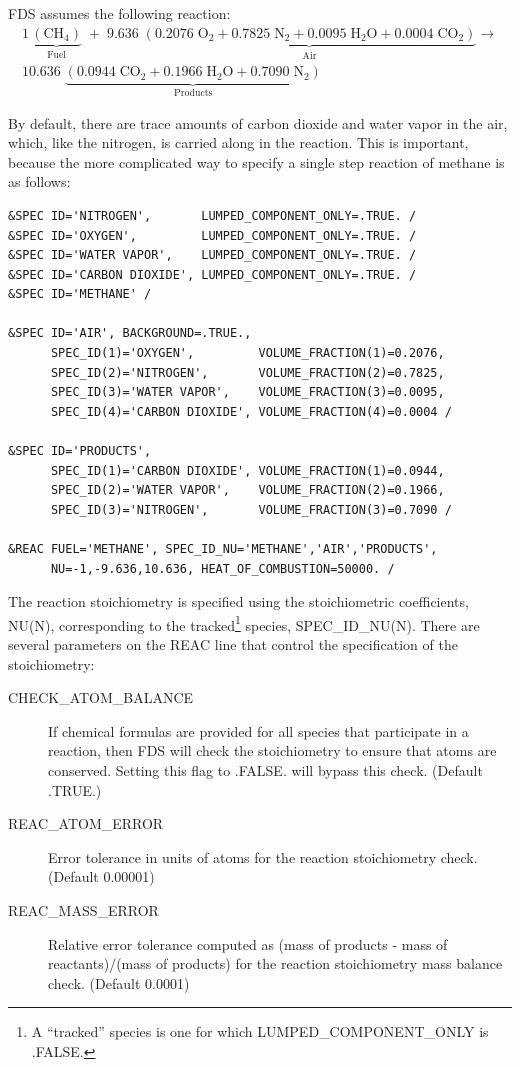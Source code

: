 \documentclass[11pt]{book}
\begin{document}
\noindent FDS assumes the following reaction:
\begin{multline}
1\,\underbrace{\mathrm{ (CH_4) }}_\text{Fuel} \; + \;
9.636 \; \underbrace{ \mathrm{\left( 0.2076 \; O_2 + 0.7825 \; N_2 + 0.0095 \; H_2O + 0.0004 \; CO_2 \right)}}_\text{Air} \longrightarrow \\
10.636 \; \underbrace{\mathrm{(0.0944 \; CO_2 +  0.1966 \; H_2O + 0.7090 \; N_2)}}_\text{Products}
\end{multline}

\noindent By default, there are trace amounts of carbon dioxide and water vapor in the air, which, like the nitrogen, is carried along in the reaction. This is important, because the more complicated way to specify a single step reaction of methane is as follows:

\begin{lstlisting}
&SPEC ID='NITROGEN',       LUMPED_COMPONENT_ONLY=.TRUE. /
&SPEC ID='OXYGEN',         LUMPED_COMPONENT_ONLY=.TRUE. /
&SPEC ID='WATER VAPOR',    LUMPED_COMPONENT_ONLY=.TRUE. /
&SPEC ID='CARBON DIOXIDE', LUMPED_COMPONENT_ONLY=.TRUE. /
&SPEC ID='METHANE' /

&SPEC ID='AIR', BACKGROUND=.TRUE.,
      SPEC_ID(1)='OXYGEN',         VOLUME_FRACTION(1)=0.2076,
      SPEC_ID(2)='NITROGEN',       VOLUME_FRACTION(2)=0.7825,
      SPEC_ID(3)='WATER VAPOR',    VOLUME_FRACTION(3)=0.0095,
      SPEC_ID(4)='CARBON DIOXIDE', VOLUME_FRACTION(4)=0.0004 /

&SPEC ID='PRODUCTS',
      SPEC_ID(1)='CARBON DIOXIDE', VOLUME_FRACTION(1)=0.0944,
      SPEC_ID(2)='WATER VAPOR',    VOLUME_FRACTION(2)=0.1966,
      SPEC_ID(3)='NITROGEN',       VOLUME_FRACTION(3)=0.7090 /

&REAC FUEL='METHANE', SPEC_ID_NU='METHANE','AIR','PRODUCTS',
      NU=-1,-9.636,10.636, HEAT_OF_COMBUSTION=50000. /
\end{lstlisting}

\noindent
The reaction stoichiometry is specified using the stoichiometric coefficients, {\ct NU(N)}, corresponding to the tracked\footnote{A ``tracked'' species is one for which {\ct LUMPED\_COMPONENT\_ONLY} is {\ct .FALSE.}} species, {\ct SPEC\_ID\_NU(N)}. There are several parameters on the {\ct REAC} line that control the specification of the stoichiometry:
\begin{description}
\item[{\ct CHECK\_ATOM\_BALANCE}] If chemical formulas are provided for all species that participate in a reaction, then FDS will check the stoichiometry to ensure that atoms are conserved.  Setting this flag to {\ct .FALSE.} will bypass this check.  (Default {\ct .TRUE.})
\item[{\ct REAC\_ATOM\_ERROR}] Error tolerance in units of atoms for the reaction stoichiometry check.  (Default 0.00001)
\item[{\ct REAC\_MASS\_ERROR}] Relative error tolerance computed as (mass of products - mass of reactants)/(mass of products) for the reaction stoichiometry mass balance check.  (Default 0.0001)
\end{description}
\end{document}
